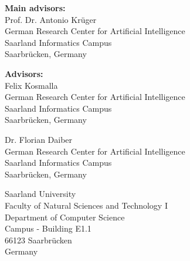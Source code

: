 \pagestyle{empty}

\vspace*{0.5cm}
\textbf{Main advisors:}\\
Prof. Dr. Antonio Krüger\\
German Research Center for Artificial Intelligence\\
Saarland Informatics Campus\\
Saarbrücken, Germany

\vspace*{0.5cm}
\textbf{Advisors:}\\
Felix Kosmalla\\
German Research Center for Artificial Intelligence\\
Saarland Informatics Campus\\
Saarbrücken, Germany

\vspace*{0.5cm}
Dr. Florian Daiber\\
German Research Center for Artificial Intelligence\\
Saarland Informatics Campus\\
Saarbrücken, Germany


\vspace{3.5cm}


\vspace{1.5cm}


\vspace{3cm}
Saarland University\\
Faculty of Natural Sciences and Technology I\\
Department of Computer Science\\
Campus - Building E1.1\\
66123 Saarbrücken\\
Germany\\


